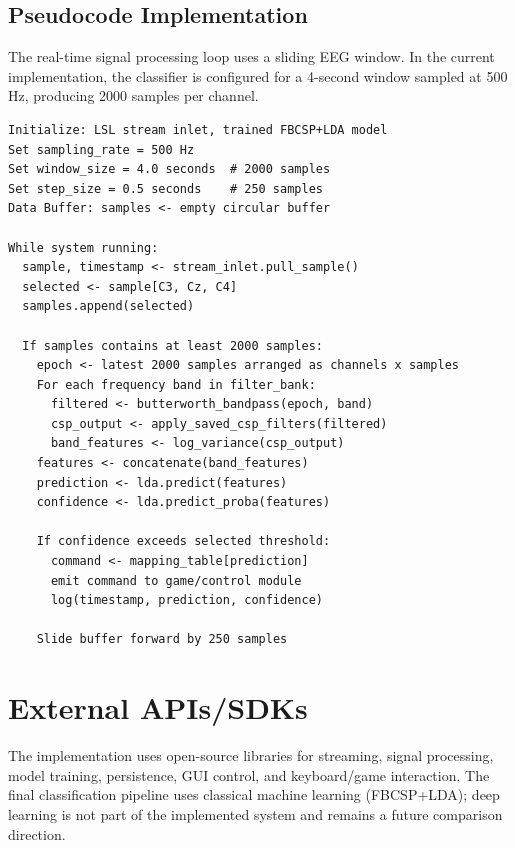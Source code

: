 \subsection{Pseudocode Implementation}

The real-time signal processing loop uses a sliding EEG window. In the current implementation, the classifier is configured for a 4-second window sampled at 500 Hz, producing 2000 samples per channel.

\begin{verbatim}
Initialize: LSL stream inlet, trained FBCSP+LDA model
Set sampling_rate = 500 Hz
Set window_size = 4.0 seconds  # 2000 samples
Set step_size = 0.5 seconds    # 250 samples
Data Buffer: samples <- empty circular buffer

While system running:
  sample, timestamp <- stream_inlet.pull_sample()
  selected <- sample[C3, Cz, C4]
  samples.append(selected)

  If samples contains at least 2000 samples:
    epoch <- latest 2000 samples arranged as channels x samples
    For each frequency band in filter_bank:
      filtered <- butterworth_bandpass(epoch, band)
      csp_output <- apply_saved_csp_filters(filtered)
      band_features <- log_variance(csp_output)
    features <- concatenate(band_features)
    prediction <- lda.predict(features)
    confidence <- lda.predict_proba(features)

    If confidence exceeds selected threshold:
      command <- mapping_table[prediction]
      emit command to game/control module
      log(timestamp, prediction, confidence)

    Slide buffer forward by 250 samples
\end{verbatim}

\section{External APIs/SDKs}

The implementation uses open-source libraries for streaming, signal processing, model training, persistence, GUI control, and keyboard/game interaction. The final classification pipeline uses classical machine learning (FBCSP+LDA); deep learning is not part of the implemented system and remains a future comparison direction.

